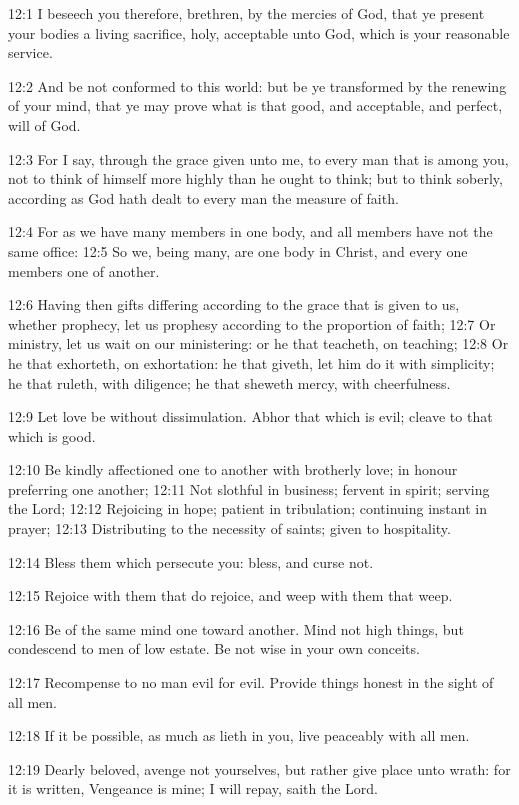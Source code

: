 12:1 I beseech you therefore, brethren, by the mercies of God, that ye
present your bodies a living sacrifice, holy, acceptable unto God,
which is your reasonable service.

12:2 And be not conformed to this world: but be ye transformed by the
renewing of your mind, that ye may prove what is that good, and
acceptable, and perfect, will of God.

12:3 For I say, through the grace given unto me, to every man that is
among you, not to think of himself more highly than he ought to think;
but to think soberly, according as God hath dealt to every man the
measure of faith.

12:4 For as we have many members in one body, and all members have not
the same office: 12:5 So we, being many, are one body in Christ, and
every one members one of another.

12:6 Having then gifts differing according to the grace that is given
to us, whether prophecy, let us prophesy according to the proportion
of faith; 12:7 Or ministry, let us wait on our ministering: or he that
teacheth, on teaching; 12:8 Or he that exhorteth, on exhortation: he
that giveth, let him do it with simplicity; he that ruleth, with
diligence; he that sheweth mercy, with cheerfulness.

12:9 Let love be without dissimulation. Abhor that which is evil;
cleave to that which is good.

12:10 Be kindly affectioned one to another with brotherly love; in
honour preferring one another; 12:11 Not slothful in business; fervent
in spirit; serving the Lord; 12:12 Rejoicing in hope; patient in
tribulation; continuing instant in prayer; 12:13 Distributing to the
necessity of saints; given to hospitality.

12:14 Bless them which persecute you: bless, and curse not.

12:15 Rejoice with them that do rejoice, and weep with them that weep.

12:16 Be of the same mind one toward another. Mind not high things,
but condescend to men of low estate. Be not wise in your own conceits.

12:17 Recompense to no man evil for evil. Provide things honest in the
sight of all men.

12:18 If it be possible, as much as lieth in you, live peaceably with
all men.

12:19 Dearly beloved, avenge not yourselves, but rather give place
unto wrath: for it is written, Vengeance is mine; I will repay, saith
the Lord.

